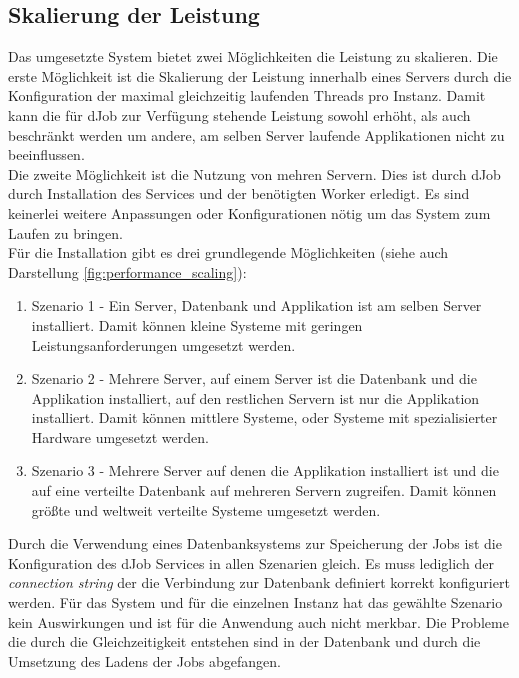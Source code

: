 \subsection{Skalierung der Leistung} \label{sec:scaling}
Das umgesetzte System bietet zwei Möglichkeiten die Leistung zu skalieren. Die erste Möglichkeit ist die Skalierung der Leistung innerhalb eines Servers durch die Konfiguration der maximal gleichzeitig laufenden Threads pro Instanz. Damit kann die für dJob zur Verfügung stehende Leistung sowohl erhöht, als auch beschränkt werden um andere, am selben Server laufende Applikationen nicht zu beeinflussen.
\\Die zweite Möglichkeit ist die Nutzung von mehren Servern. Dies ist durch dJob durch Installation des Services und der benötigten Worker erledigt. Es sind keinerlei weitere Anpassungen oder Konfigurationen nötig um das System zum Laufen zu bringen. 
\\Für die Installation gibt es drei grundlegende Möglichkeiten (siehe auch Darstellung \ref{fig:performance_scaling}):
\begin{enumerate}
	\item Szenario 1 - Ein Server, Datenbank und Applikation ist am selben Server installiert. Damit können kleine Systeme mit geringen Leistungsanforderungen umgesetzt werden.
	\item Szenario 2 - Mehrere Server, auf einem Server ist die Datenbank und die Applikation installiert, auf den restlichen Servern ist nur die Applikation installiert. Damit können mittlere Systeme, oder Systeme mit spezialisierter Hardware umgesetzt werden.
	\item Szenario 3 - Mehrere Server auf denen die Applikation installiert ist und die auf eine verteilte Datenbank auf mehreren Servern zugreifen. Damit können größte und weltweit verteilte Systeme umgesetzt werden.
\end{enumerate}
Durch die Verwendung eines Datenbanksystems zur Speicherung der Jobs ist die Konfiguration des dJob Services in allen Szenarien gleich. Es muss lediglich der \emph{connection string} der die Verbindung zur Datenbank definiert korrekt konfiguriert werden. Für das System und für die einzelnen Instanz hat das gewählte Szenario kein Auswirkungen und ist für die Anwendung auch nicht merkbar. Die Probleme die durch die Gleichzeitigkeit entstehen sind in der Datenbank und durch die Umsetzung des Ladens der Jobs abgefangen. 
